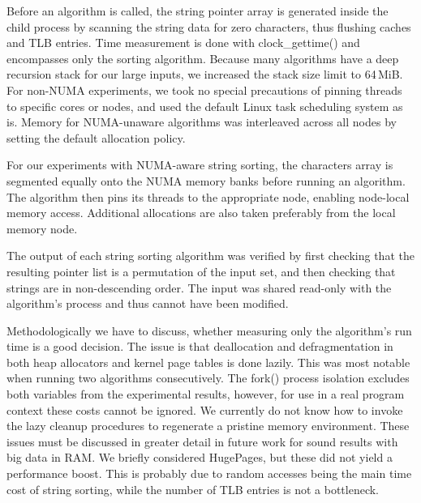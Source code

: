 \documentclass[a4paper]{myjournal}
\begin{document}
Before an algorithm is called, the string pointer array is generated inside the
child process by scanning the string data for zero characters, thus flushing
caches and TLB entries. Time measurement is done with clock\_gettime() and
encompasses only the sorting algorithm. Because many algorithms have a deep
recursion stack for our large inputs, we increased the stack size limit to
64\,MiB. For non-NUMA experiments, we took no special precautions of pinning
threads to specific cores or nodes, and used the default Linux task scheduling
system as is. Memory for NUMA-unaware algorithms was interleaved across all
nodes by setting the default allocation policy.

For our experiments with NUMA-aware string sorting, the characters array is
segmented equally onto the NUMA memory banks before running an algorithm.  The
algorithm then pins its threads to the appropriate node, enabling node-local
memory access. Additional allocations are also taken preferably from the local
memory node.

The output of each string sorting algorithm was verified by first checking that
the resulting pointer list is a permutation of the input set, and then checking
that strings are in non-descending order. The input was shared read-only with
the algorithm's process and thus cannot have been modified.

Methodologically we have to discuss, whether measuring only the algorithm's run
time is a good decision. The issue is that deallocation and defragmentation in
both heap allocators and kernel page tables is done lazily. This was most
notable when running two algorithms consecutively. The fork() process isolation
excludes both variables from the experimental results, however, for use in a
real program context these costs cannot be ignored. We currently do not know
how to invoke the lazy cleanup procedures to regenerate a pristine memory
environment. These issues must be discussed in greater detail in future work for
sound results with big data in RAM.  We briefly considered HugePages, but these
did not yield a performance boost. This is probably due to random accesses being
the main time cost of string sorting, while the number of TLB entries is not a
bottleneck.
\end{document}
